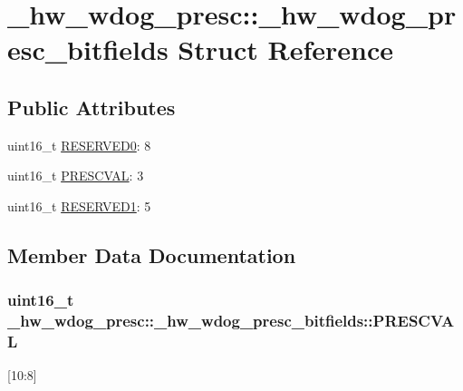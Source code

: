 \hypertarget{struct__hw__wdog__presc_1_1__hw__wdog__presc__bitfields}{}\section{\+\_\+hw\+\_\+wdog\+\_\+presc\+:\+:\+\_\+hw\+\_\+wdog\+\_\+presc\+\_\+bitfields Struct Reference}
\label{struct__hw__wdog__presc_1_1__hw__wdog__presc__bitfields}
\subsection*{Public Attributes}
\begin{DoxyCompactItemize}
\item 
uint16\+\_\+t \hyperlink{struct__hw__wdog__presc_1_1__hw__wdog__presc__bitfields_a84c9acb67d9a05d4962c52a4c8afd5b7}{R\+E\+S\+E\+R\+V\+E\+D0}\+: 8
\item 
uint16\+\_\+t \hyperlink{struct__hw__wdog__presc_1_1__hw__wdog__presc__bitfields_a80708c6820fcf69e6b60c1dccb0551ca}{P\+R\+E\+S\+C\+V\+AL}\+: 3
\item 
uint16\+\_\+t \hyperlink{struct__hw__wdog__presc_1_1__hw__wdog__presc__bitfields_a971430ddbb5973e53da35490116096ba}{R\+E\+S\+E\+R\+V\+E\+D1}\+: 5
\end{DoxyCompactItemize}


\subsection{Member Data Documentation}
\subsubsection[{\texorpdfstring{P\+R\+E\+S\+C\+V\+AL}{PRESCVAL}}]{\setlength{\rightskip}{0pt plus 5cm}uint16\+\_\+t \+\_\+hw\+\_\+wdog\+\_\+presc\+::\+\_\+hw\+\_\+wdog\+\_\+presc\+\_\+bitfields\+::\+P\+R\+E\+S\+C\+V\+AL}\hypertarget{struct__hw__wdog__presc_1_1__hw__wdog__presc__bitfields_a80708c6820fcf69e6b60c1dccb0551ca}{}\label{struct__hw__wdog__presc_1_1__hw__wdog__presc__bitfields_a80708c6820fcf69e6b60c1dccb0551ca}
\mbox{[}10\+:8\mbox{]} 
